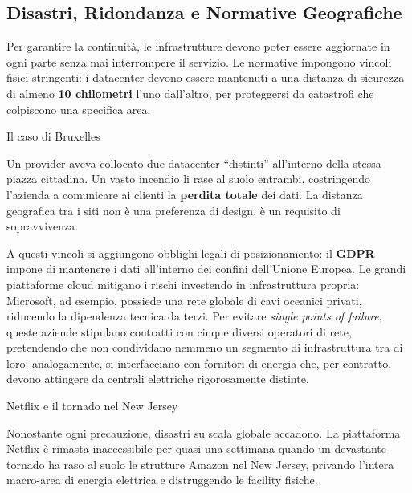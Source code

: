 \documentclass[
  italian,
  openany]{book}
\begin{document}
\subsection{Disastri, Ridondanza e Normative
Geografiche}\label{disastri-ridondanza-e-normative-geografiche}

Per garantire la continuità, le infrastrutture devono poter essere
aggiornate in ogni parte senza mai interrompere il servizio. Le
normative impongono vincoli fisici stringenti: i datacenter devono
essere mantenuti a una distanza di sicurezza di almeno \textbf{10
chilometri} l'uno dall'altro, per proteggersi da catastrofi che
colpiscono una specifica area.

\begin{calloutwarning}{Il caso di Bruxelles}

Un provider aveva collocato due datacenter ``distinti'' all'interno
della stessa piazza cittadina. Un vasto incendio li rase al suolo
entrambi, costringendo l'azienda a comunicare ai clienti la
\textbf{perdita totale} dei dati. La distanza geografica tra i siti non
è una preferenza di design, è un requisito di sopravvivenza.

\end{calloutwarning}

A questi vincoli si aggiungono obblighi legali di posizionamento: il
\textbf{GDPR} impone di mantenere i dati all'interno dei confini
dell'Unione Europea. Le grandi piattaforme cloud mitigano i rischi
investendo in infrastruttura propria: Microsoft, ad esempio, possiede
una rete globale di cavi oceanici privati, riducendo la dipendenza
tecnica da terzi. Per evitare \emph{single points of failure}, queste
aziende stipulano contratti con cinque diversi operatori di rete,
pretendendo che non condividano nemmeno un segmento di infrastruttura
tra di loro; analogamente, si interfacciano con fornitori di energia
che, per contratto, devono attingere da centrali elettriche
rigorosamente distinte.

\begin{callouttip}{Netflix e il tornado nel New Jersey}

Nonostante ogni precauzione, disastri su scala globale accadono. La
piattaforma Netflix è rimasta inaccessibile per quasi una settimana
quando un devastante tornado ha raso al suolo le strutture Amazon nel
New Jersey, privando l'intera macro-area di energia elettrica e
distruggendo le facility fisiche.

\end{callouttip}
\end{document}

